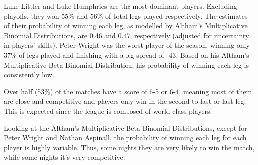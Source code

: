 \documentclass[
]{article}
\begin{document}
Luke Littler and Luke Humphries are the most dominant players. Excluding
playoffs, they won 55\% and 56\% of total legs played respectively. The
estimates of their probability of winning each leg, as modelled by
Altham's Multiplicative Binomial Distributions, are 0.46 and 0.47,
respectively (adjusted for uncertainty in players' skills). Peter Wright
was the worst player of the season, winning only 37\% of legs played and
finishing with a leg spread of -43. Based on his Altham's Multiplicative
Beta Binomial Distribution, his probability of winning each leg is
consistently low.

Over half (53\%) of the matches have a score of 6-5 or 6-4, meaning most
of them are close and competitive and players only win in the
second-to-last or last leg. This is expected since the league is
composed of world-class players.

Looking at the Altham's Multiplicative Beta Binomial Distributions,
except for Peter Wright and Nathan Aspinall, the probability of winning
each leg for each player is highly variable. Thus, some nights they are
very likely to win the match, while some nights it's very competitive.
\end{document}
